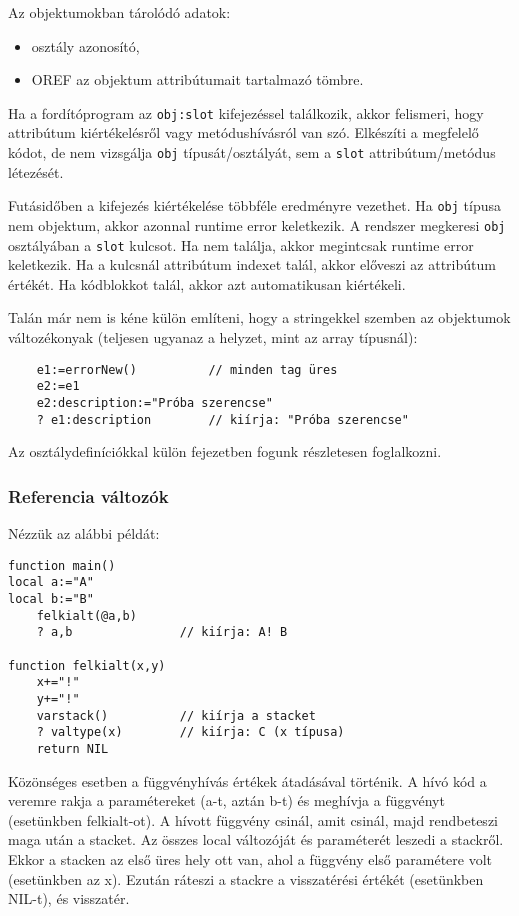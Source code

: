 Az objektumokban tárolódó adatok:
\begin{itemize}
  \item osztály azonosító,
  \item OREF az objektum attribútumait tartalmazó tömbre.
\end{itemize}

Ha a fordítóprogram az \verb!obj:slot! kifejezéssel találkozik,
akkor felismeri, hogy attribútum kiértékelésről vagy metódushívásról van szó.
Elkészíti a megfelelő kódot, de nem vizsgálja \verb!obj! típusát/osztályát,
sem a \verb!slot! attribútum/metódus létezését.

Futásidőben a kifejezés kiértékelése többféle eredményre vezethet. 
Ha \verb!obj! típusa nem objektum, akkor azonnal runtime error keletkezik. 
A rendszer megkeresi \verb!obj! osztályában a \verb!slot! kulcsot.
Ha nem találja, akkor megintcsak runtime error keletkezik. 
Ha a kulcsnál attribútum indexet talál, akkor előveszi az attribútum értékét.
Ha kódblokkot talál, akkor azt automatikusan kiértékeli.

Talán már nem is kéne külön említeni, hogy a stringekkel szemben
az objektumok változékonyak (teljesen ugyanaz a helyzet, mint az array típusnál):
\begin{verbatim}
    e1:=errorNew()          // minden tag üres
    e2:=e1
    e2:description:="Próba szerencse"
    ? e1:description        // kiírja: "Próba szerencse"
\end{verbatim}

Az osztálydefiníciókkal külön fejezetben fogunk részletesen foglalkozni.







\subsubsection{Referencia változók}

Nézzük az alábbi példát:
\begin{verbatim}
function main()
local a:="A"
local b:="B"
    felkialt(@a,b)
    ? a,b               // kiírja: A! B
    
function felkialt(x,y)
    x+="!"
    y+="!"
    varstack()          // kiírja a stacket
    ? valtype(x)        // kiírja: C (x típusa)
    return NIL
\end{verbatim}


Közönséges esetben a függvényhívás értékek átadásával történik.
A hívó kód a veremre rakja a paramétereket (a-t, aztán b-t) és meghívja
a függvényt (esetünkben felkialt-ot). A hívott függvény csinál, amit csinál,
majd rendbeteszi maga után a stacket. Az összes local változóját és paraméterét
leszedi a stackről. Ekkor a stacken az első üres hely ott van, 
ahol a függvény első paramétere volt (esetünkben az x). Ezután ráteszi a stackre 
a visszatérési értékét (esetünkben NIL-t), és visszatér.

